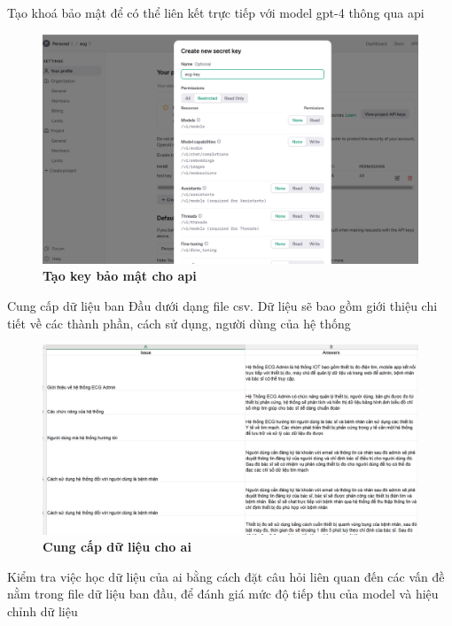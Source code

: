 Tạo khoá bảo mật để có thể liên kết trực tiếp với model gpt-4 thông qua api 

\begin{figure}[H]
  \centering
  \includegraphics[scale=0.4]{Images/server/ai/private-key.png}
  \caption[Tạo key bảo mật cho api]{\bfseries \fontsize{12pt}{0pt}
  \selectfont Tạo key bảo mật cho api}
  \label{create-ai-project} %
\end{figure}

Cung cấp dữ liệu ban Đầu dưới dạng file csv. Dữ liệu sẽ bao gồm giới thiệu chi tiết về các thành phần, cách sử dụng, người dùng của hệ thống

\begin{figure}[H]
  \centering
  \includegraphics[scale=0.4]{Images/server/ai/training-ai.png}
  \caption[Cung cấp dữ liệu cho ai]{\bfseries \fontsize{12pt}{0pt}
  \selectfont Cung cấp dữ liệu cho ai}
  \label{create-ai-project} %
\end{figure}

Kiểm tra việc học dữ liệu của ai bằng cách đặt câu hỏi liên quan đến các vấn đề nằm trong file dữ liệu ban đầu, để đánh giá mức độ tiếp thu của model và hiệu chỉnh dữ liệu

